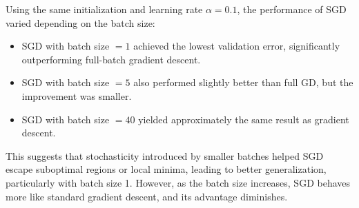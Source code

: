 \documentclass{article}
\newenvironment{answer}{\sf \begingroup\color{ForestGreen}}{\endgroup}%
\begin{document}
  \begin{answer}
    Using the same initialization and learning rate $\alpha = 0.1$, the performance of SGD varied depending on the batch size:
    \begin{itemize}
        \item SGD with batch size $ = 1$ achieved the lowest validation error, significantly outperforming full-batch gradient descent.
        \item SGD with batch size $= 5$ also performed slightly better than full GD, but the improvement was smaller.
        \item SGD with batch size $= 40$ yielded approximately the same result as gradient descent.
    \end{itemize}
    This suggests that stochasticity introduced by smaller batches helped SGD escape suboptimal regions or local minima, leading to better generalization, particularly with batch size 1. However, as the batch size increases, SGD behaves more like standard gradient descent, and its advantage diminishes.
  \end{answer}
\clearpage


\end{document}
